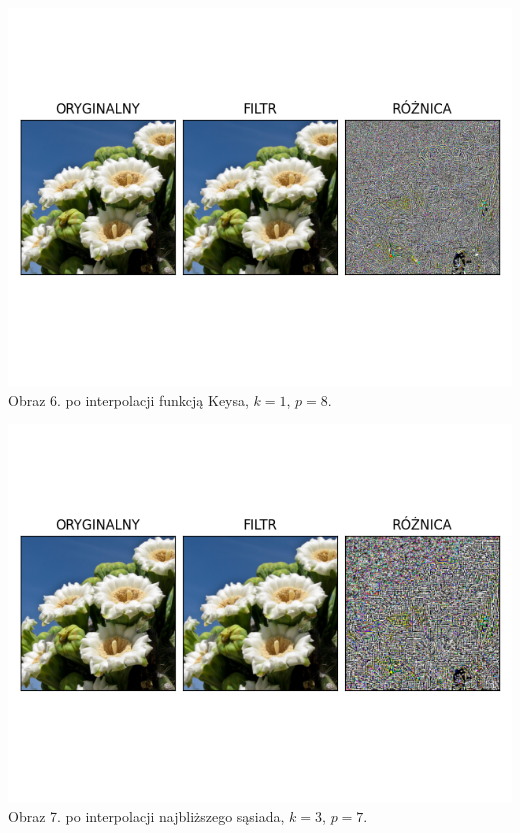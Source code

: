 \documentclass[14pt]{article}
\begin{document}
\begin{center}
    \includegraphics[scale=0.7]{images/keys_k1_p8.png}
    \\ \small Obraz 6. po interpolacji funkcją Keysa,
    $k=1$, $p=8$.


    \includegraphics[scale=0.7]{images/nn_k3_p7.png}
    \\ \small Obraz 7. po interpolacji najbliższego sąsiada, 
    $k=3$, $p=7$.


\end{center}
\end{document}
